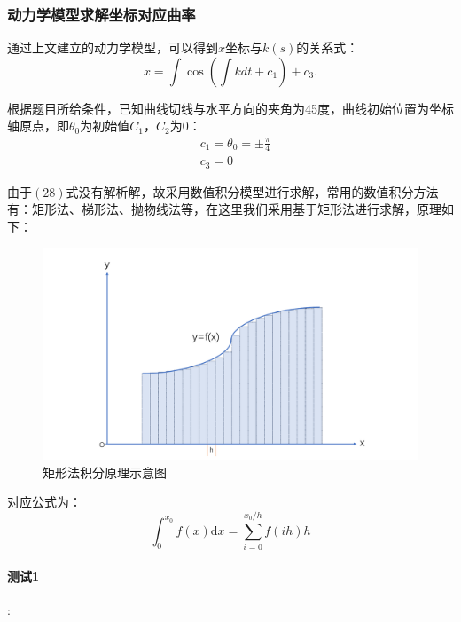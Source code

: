 \documentclass[withoutpreface,bwprint]{cumcmthesis}
\begin{document}
\subsubsection{动力学模型求解坐标对应曲率}
通过上文建立的动力学模型，可以得到$x$坐标与$k(s)$的关系式：
\begin{equation}
x=\int \cos \left(\int k d t+c_1\right)+c_3 .
\end{equation}

根据题目所给条件，已知曲线切线与水平方向的夹角为45度，曲线初始位置为坐标轴原点，即$\theta_0$为初始值$C_1$，$C_2$为$0$：
\begin{equation}
\begin{aligned}
& c_1=\theta_0= \pm \frac{\pi}{4} \\
& c_3=0
\end{aligned}
\end{equation}

由于$(28)$式没有解析解，故采用数值积分模型进行求解，常用的数值积分方法有：矩形法、梯形法、抛物线法等，在这里我们采用基于矩形法进行求解，原理如下：
\begin{figure}[!h]
\centering
\includegraphics[width=.9\textwidth]{jux.pdf}
\caption{矩形法积分原理示意图}
\end{figure}

对应公式为：
\begin{equation}
\int_0^{x_0} f(x) \mathrm{d} x=\sum_{i=0}^{x_0 / h} f(i h) h
\end{equation}


\paragraph{测试1}:
\end{document}
